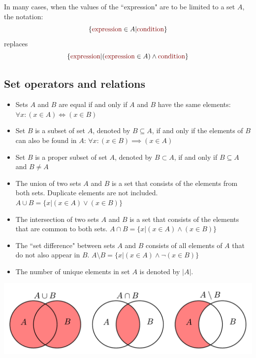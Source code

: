 \documentclass{article}
\newcommand{\dr}[1]{\textcolor{dark_red}{#1}}
\begin{document}
In many cases, when the values of the ``\dr{expression}" are to be limited to a set \(A\), the notation:
\[\{\dr{\text{expression}} \in A|\dr{\text{condition}}\}\]
replaces 
\[\{\dr{\text{expression}}| (\dr{\text{expression}} \in A) \wedge \dr{\text{condition}}\}\]




\subsection*{Set operators and relations}

\begin{itemize}
\item Sets \(A\) and \(B\) are equal if and only if \(A\) and \(B\) have the same elements: \(\forall x : (x \in A) \iff (x \in B)\)
\item Set \(B\) is a subset of set \(A\), denoted by \(B \subseteq A\), if and only if the elements of \(B\) can also be found in \(A\): \(\forall x : (x \in B) \implies (x \in A)\)
\item Set \(B\) is a proper subset of set \(A\), denoted by \(B \subset A\), if and only if \(B \subseteq A\) and \(B \neq A\)
\item The union of two sets \(A\) and \(B\) is a set that consists of the elements from both sets. Duplicate elements are not included. \(A \cup B = \{x | (x \in A) \vee (x \in B)\}\)
\item The intersection of two sets \(A\) and \(B\) is a set that consists of the elements that are common to both sets. \(A \cap B = \{x | (x \in A) \wedge (x \in B)\}\)
\item The ``set difference" between sets \(A\) and \(B\) consists of all elements of \(A\) that do not also appear in \(B\). \(A \setminus B = \{x | (x \in A) \wedge \neg(x \in B)\}\)
\item The number of unique elements in set \(A\) is denoted by \(|A|\).
\end{itemize}

\includegraphics[width = \textwidth]{set_operations}
\end{document}
